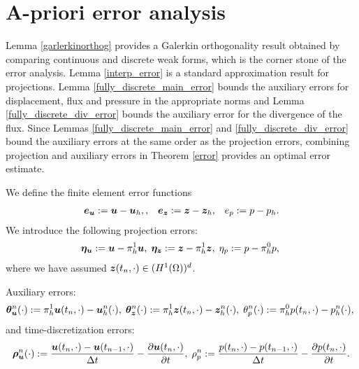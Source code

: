 \section{A-priori error analysis}
\label{sec:apriori}
Lemma \ref{garlerkinorthog} provides a Galerkin orthogonality result obtained by comparing continuous and discrete weak forms, which is the corner stone of the error analysis.  Lemma \ref{interp_error} is a standard approximation result for projections. Lemma \ref{fully_discrete_main_error} bounds the auxiliary errors for displacement, flux and pressure in the appropriate norms and Lemma \ref{fully_discrete_div_error} bounds the auxiliary error for the divergence of the flux. Since Lemmas \ref{fully_discrete_main_error} and \ref{fully_discrete_div_error} bound the auxiliary errors at the same order as the projection errors, combining projection and auxiliary errors in Theorem \ref{error} provides an optimal error estimate.

We define the finite element error functions
\begin{eqnarray*}
\boldsymbol{e}_{\boldsymbol{u}} :=\boldsymbol{u} - \boldsymbol{u}_{h}, ,\; \; \;  \boldsymbol{e}_{\boldsymbol{z}}:=\boldsymbol{z} - \boldsymbol{z}_{h}, \;\; \;  {e}_{{p}}:={p} - {p_h}.
\label{eqn:fe_error_def}
\end{eqnarray*}
We introduce the following projection errors:
\begin{eqnarray*}
\boldsymbol{\eta}_{\boldsymbol{u}}:=\boldsymbol{u} - \pi_{h}^{1}\boldsymbol{u}, \; \boldsymbol{\eta}_{\boldsymbol{z}} :=\boldsymbol{z} - \pi_{h}^{1} \boldsymbol{z},\; \eta_p :={p} - \pi_{h}^{0}{p},\;
\label{eqn:proj_error_def}
\end{eqnarray*}
where we have assumed $\boldsymbol{z}(t_{n},\cdot) \in (H^1(\Omega))^d$.

Auxiliary errors:
\begin{equation}
\boldsymbol{\theta}^{n}_{\boldsymbol{u}} (\cdot ):=\pi_{h}^{1}\boldsymbol{u}(t_{n}, \cdot)-\boldsymbol{u}_{h}^{n} (\cdot ),\; \boldsymbol{\theta}^{n}_{\boldsymbol{z}} (\cdot ):=\pi_{h}^{1}\boldsymbol{z}(t_{n},\cdot)-\boldsymbol{z}_{h}^{n} (\cdot ),\; {\theta}^{n}_{{p}} (\cdot ):= \pi_{h}^{0}p(t_{n},\cdot)-p_h^{n} (\cdot ),\;
\label{eqn:aux_def}
\end{equation}
and time-discretization errors:
\begin{equation}
\boldsymbol{\rho}_{\boldsymbol{u}}^{n} (\cdot ):= \frac{\boldsymbol{u}(t_{n}, \cdot)-\boldsymbol{u}(t_{n-1},\cdot)}{\Delta t}  - \frac{ \partial \boldsymbol{u}(t_{n}, \cdot) }{\partial t},\;
{\rho}_{p}^{n}:= \frac{p(t_{n},\cdot)-p(t_{n-1},\cdot)}{\Delta t}  - \frac{ \partial p(t_{n},\cdot) }{\partial t}.
\end{equation}


